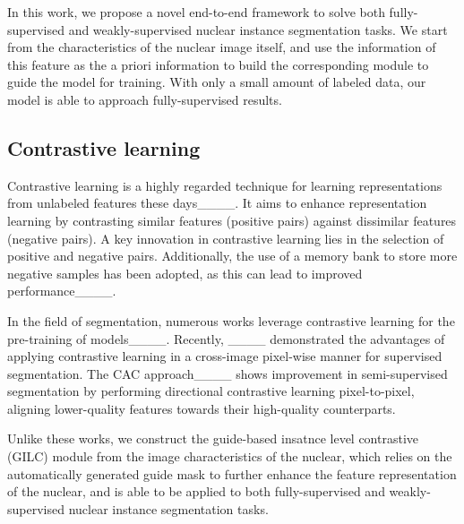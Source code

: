 In this work, we propose a novel end-to-end framework to solve both fully-supervised and weakly-supervised nuclear instance segmentation tasks.
We start from the characteristics of the nuclear image itself, and use the information of this feature as the a priori information to build the corresponding module to guide the model for training.
With only a small amount of labeled data, our model is able to approach fully-supervised results.

\subsection{Contrastive learning}
Contrastive learning is a highly regarded technique for learning representations from unlabeled features these days____. 
It aims to enhance representation learning by contrasting similar features (positive pairs) against dissimilar features (negative pairs). A key innovation in contrastive learning lies in the selection of positive and negative pairs. Additionally, the use of a memory bank to store more negative samples has been adopted, as this can lead to improved performance____.

In the field of segmentation, numerous works leverage contrastive learning for the pre-training of models____. 
Recently, ____ demonstrated the advantages of applying contrastive learning in a cross-image pixel-wise manner for supervised segmentation. 
The CAC approach____ shows improvement in semi-supervised segmentation by performing directional contrastive learning pixel-to-pixel, aligning lower-quality features towards their high-quality counterparts.

Unlike these works, we construct the guide-based insatnce level contrastive (GILC) module from the image characteristics of the nuclear, which relies on the automatically generated guide mask to further enhance the feature representation of the nuclear, and is able to be applied to both fully-supervised and weakly-supervised nuclear instance segmentation tasks.

% 